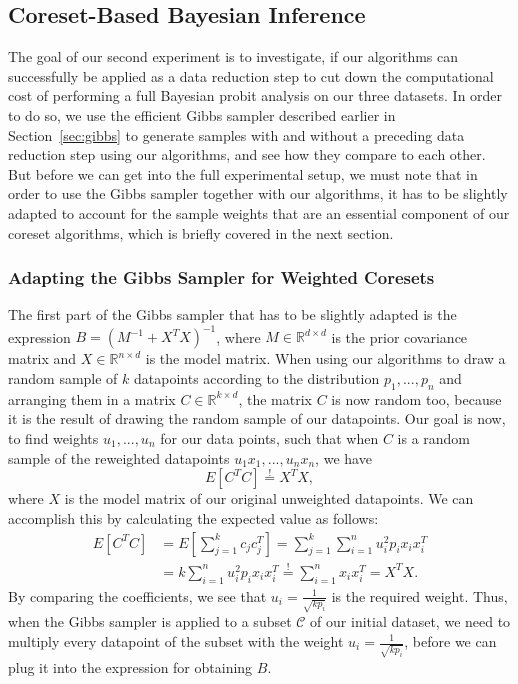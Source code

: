 \subsection{Coreset-Based Bayesian Inference}

The goal of our second experiment is to investigate, if our
algorithms can successfully be applied as a data reduction
step to cut down the computational cost of performing
a full Bayesian probit analysis on our three datasets.
In order to do so, we use the efficient Gibbs sampler
described earlier in Section~\ref{sec:gibbs} to generate
samples with and without a preceding data reduction step using
our algorithms, and see how they compare to each other.
But before we can get into the full experimental setup,
we must note that in order to use the Gibbs sampler together
with our algorithms, it has to be slightly adapted
to account for the sample weights that are an
essential component of our coreset algorithms,
which is briefly covered in the next section.

\subsubsection{Adapting the Gibbs Sampler for Weighted Coresets}
\label{sec:gibbs-adaptation}

The first part of the Gibbs sampler that has to be slightly adapted
is the expression $B = (M^{-1} + X^TX)^{-1}$, where
$M \in \mathbb{R}^{d \times d}$
is the prior covariance matrix and
$X \in \mathbb{R}^{n \times d}$ is the model matrix.
When using our algorithms to draw a random sample of $k$
datapoints according to the distribution $p_1, ..., p_n$
and arranging them in a matrix $C \in \mathbb{R}^{k \times d}$,
the matrix $C$ is now random too, because it is the result of
drawing the random sample of our datapoints.
Our goal is now, to find weights $u_1, ..., u_n$ for our
data points, such that when $C$ is a random sample of the
reweighted datapoints $u_1x_1, ..., u_nx_n$, we have
\begin{equation*}
    E[C^TC] \overset{!}{=} X^TX,
\end{equation*}
where $X$ is the model matrix of our original unweighted datapoints.
We can accomplish this by calculating the expected value as follows:
\begin{align*}
    E[C^TC] & = E\left[\sum_{j=1}^k c_jc_j^T\right]
    = \sum_{j=1}^k \sum_{i=1}^n u_i^2 p_i x_i x_i^T \\
            & = k\sum_{i=1}^n u_i^2 p_i x_i x_i^T
    \overset{!}{=} \sum_{i=1}^n x_i x_i^T = X^TX.
\end{align*}
By comparing the coefficients, we see that
$u_i = \frac{1}{\sqrt{k p_i}}$ is the required weight.
Thus, when the Gibbs sampler is applied to a subset
$\mathcal{C}$ of our initial dataset, we need to multiply every
datapoint of the subset with the weight
$u_i = \frac{1}{\sqrt{k p_i}}$, before we can plug it into
the expression for obtaining $B$.

